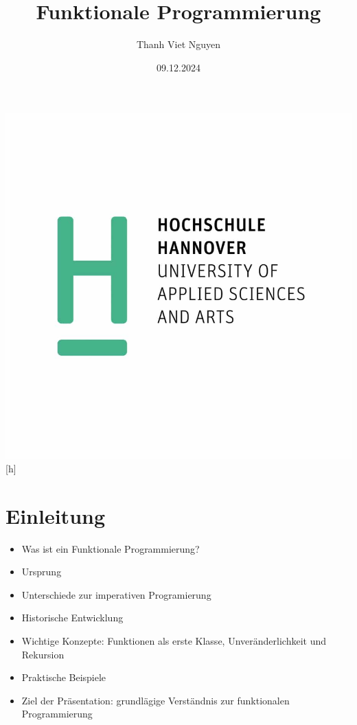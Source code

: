 \documentclass{beamer}
\title{Funktionale Programmierung}
\author{Thanh Viet Nguyen}
\begin{document}
\begin{frame}%
    \maketitle
    \centering
   \includegraphics[scale=0.15]{bilder/hsh-logo.jpg}[h]
   \date{09.12.2024}

\end{frame}

\begin{frame}
	\tableofcontents
\end{frame}


\section{Einleitung}
\begin{frame}
\begin{itemize}
\item Was ist ein Funktionale Programmierung?
\item Ursprung
\item Unterschiede zur imperativen Programierung
\item Historische Entwicklung
\item Wichtige Konzepte: Funktionen als erste Klasse, Unveränderlichkeit und Rekursion
\item Praktische Beispiele
\item Ziel der Präsentation: grundlägige Verständnis  zur funktionalen Programmierung
\end{itemize}
\end{frame}
\end{document}
